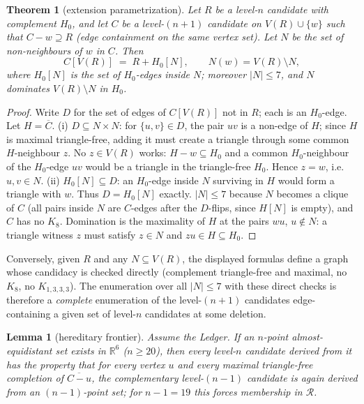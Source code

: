 \documentclass[11pt]{article}
\newtheorem{theorem}{Theorem}
\newtheorem{lemma}{Lemma}
\newcommand{\R}{\mathbb{R}}
\begin{document}
\begin{theorem}[extension parametrization]
Let $R$ be a level-$n$ candidate with complement $H_0$, and let $C$ be a
level-$(n{+}1)$ candidate on $V(R)\cup\{w\}$ such that $C-w\supseteq R$
(edge containment on the same vertex set). Let $N$ be the set of
non-neighbours of $w$ in $C$. Then
\[
C[V(R)] \;=\; R + H_0[N], \qquad N(w) = V(R)\setminus N,
\]
where $H_0[N]$ is the set of $H_0$-edges inside $N$; moreover $|N|\le 7$,
and $N$ dominates $V(R)\setminus N$ in $H_0$.
\end{theorem}

\begin{proof}
Write $D$ for the set of edges of $C[V(R)]$ not in $R$; each is an
$H_0$-edge. Let $H=\overline C$. (i) $D\subseteq N\times N$: for
$\{u,v\}\in D$, the pair $uv$ is a non-edge of $H$; since $H$ is maximal
triangle-free, adding it must create a triangle through some common
$H$-neighbour $z$. No $z\in V(R)$ works: $H-w\subseteq H_0$ and a common
$H_0$-neighbour of the $H_0$-edge $uv$ would be a triangle in the
triangle-free $H_0$. Hence $z=w$, i.e.\ $u,v\in N$. (ii)
$H_0[N]\subseteq D$: an $H_0$-edge inside $N$ surviving in $H$ would form
a triangle with $w$. Thus $D=H_0[N]$ exactly. $|N|\le 7$ because $N$
becomes a clique of $C$ (all pairs inside $N$ are $C$-edges after the
$D$-flips, since $H[N]$ is empty), and $C$ has no $K_8$. Domination is
the maximality of $H$ at the pairs $wu$, $u\notin N$: a triangle witness
$z$ must satisfy $z\in N$ and $zu\in H\subseteq H_0$.
\end{proof}

Conversely, given $R$ and any $N\subseteq V(R)$, the displayed formulas
define a graph whose candidacy is checked directly (complement
triangle-free and maximal, no $K_8$, no $K_{1,3,3,3}$). The enumeration
over all $|N|\le 7$ with these direct checks is therefore a
\emph{complete} enumeration of the level-$(n{+}1)$ candidates
edge-containing a given set of level-$n$ candidates at some deletion.

\begin{lemma}[hereditary frontier]
Assume the Ledger. If an $n$-point almost-equidistant set exists in
$\R^6$ ($n\ge 20$), then every level-$n$ candidate derived from it has
the property that for every vertex $u$ and \emph{every} maximal
triangle-free completion of $\overline{C-u}$, the complementary level-$(n-1)$
candidate is again derived from an $(n-1)$-point set; for $n-1=19$ this
forces membership in $\mathcal R$.
\end{lemma}
\end{document}
